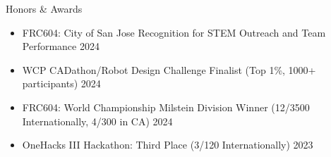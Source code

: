\documentclass[
  10pt, %
]{resume}
\begin{document}
\begin{rSection}{Honors \& Awards}

  \begin{itemize}
      \setlength\itemsep{-0.7em} %
        
      \item FRC604: City of San Jose Recognition for STEM Outreach and Team Performance \hfill 2024
              
      \item WCP CADathon/Robot Design Challenge Finalist (Top 1\%, 1000+ participants) \hfill 2024
              
      \item FRC604: World Championship Milstein Division Winner (12/3500 Internationally, 4/300 in CA) \hfill 2024
              
      \item OneHacks III Hackathon: Third Place (3/120 Internationally) \hfill 2023
              


    \end{itemize}

\end{rSection}
\end{document}
